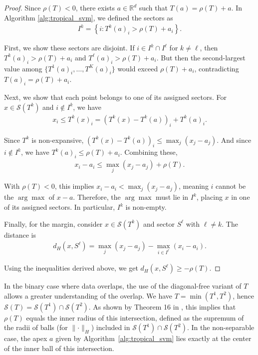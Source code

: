 \documentclass{article}
\renewcommand{\geq}{\geqslant}
\renewcommand{\leq}{\leqslant}
\newcommand{\R}{\mathbb{R}}
\begin{document}
\begin{proof}
Since $\rho(T) < 0$, there exists $a \in \R^d$ such that $T(a) = \rho(T) + a$. In Algorithm \ref{alg:tropical_svm}, we defined the sectors as
\begin{align}
I^k = \left\{i : T^k(a)_i > \rho(T) + a_i\right\}.
\end{align}

First, we show these sectors are disjoint. If $i \in I^k \cap I^{\ell}$ for $k \neq \ell$, then $T^k(a)_i > \rho(T) + a_i$ and $T^{\ell}(a)_i > \rho(T) + a_i$. But then the second-largest value among $\{T^1(a)_i,\ldots,T^K(a)_i\}$ would exceed $\rho(T) + a_i$, contradicting $T(a)_i = \rho(T) + a_i$.

Next, we show that each point belongs to one of its assigned sectors. For $x \in \mathcal{S}(T^k)$ and $i \not\in I^k$, we have
\begin{align}
x_i \leq T^k(x)_i = (T^k(x) - T^k(a))_i + T^k(a)_i.
\end{align}

Since $T^k$ is non-expansive, $(T^k(x) - T^k(a))_i \leq \max_j(x_j - a_j)$. And since $i \not\in I^k$, we have $T^k(a)_i \leq \rho(T) + a_i$. Combining these,
\begin{align}
x_i - a_i \leq \max_j(x_j - a_j) + \rho(T).
\end{align}

With $\rho(T) < 0$, this implies $x_i - a_i < \max_j(x_j - a_j)$, meaning $i$ cannot be the $\arg\max$ of $x - a$. Therefore, the $\arg\max$ must lie in $I^k$, placing $x$ in one of its assigned sectors. In particular, $I^k$ is non-empty.

Finally, for the margin, consider $x \in \mathcal{S}(T^k)$ and sector $S^{\ell}$ with $\ell \neq k$. The distance is 
\begin{align}
d_H(x, S^{\ell}) = \max_j(x_j - a_j) - \max_{i \in I^{\ell}}(x_i - a_i).
\end{align}

Using the inequalities derived above, we get $d_H(x, S^{\ell}) \geq -\rho(T)$.
\end{proof}

In the binary case where data overlaps, the use of the diagonal-free variant of $T$ allows a greater understanding of the overlap. We have $T = \min(T^1, T^2)$, hence $\mathcal{S}(T)=\mathcal{S}(T^1)\cap\mathcal{S}(T^2)$. As shown by Theorem 16 in \cite{allamigeon_condition}, this implies that $\rho(T)$ equals the inner radius of this intersection, defined as the supremum of the radii of balls (for $\lVert\cdot\rVert_H$) included in $\mathcal{S}(T^1) \cap \mathcal{S}(T^2)$. In the non-separable case, the apex $a$ given by Algorithm~\ref{alg:tropical_svm} lies exactly at the center of the inner ball of this intersection.
\end{document}
